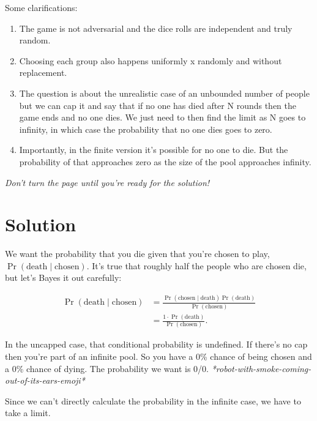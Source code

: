 \documentclass[article,twocolumn]{memoir}
\begin{document}
\newpage

Some clarifications:

\begin{enumerate}
\item The game is not adversarial and the dice rolls are independent and truly random.
\item Choosing each group also happens uniformly x randomly and without replacement.
\item The question is about the unrealistic case of an unbounded number of people but we can cap it and say that if no one has died after N rounds then the game ends and no one dies. 
We just need to then find the limit as N goes to infinity, in which case the probability that no one dies goes to zero.
\item Importantly, in the finite version it's possible for no one to die. 
But the probability of that approaches zero as the size of the pool approaches infinity.
\end{enumerate}

\emph{Don't turn the page until you're ready for the solution!}

\newpage

\chapter*{Solution}

We want the probability that you die given that you're chosen to play, 
$\Pr(\text{death} \mid \text{chosen})$.
It's true that roughly half the people who are chosen die, but let's Bayes it out carefully:

\begin{equation*}
\begin{split}
\Pr(\text{death} \mid \text{chosen}) & =
\frac{\Pr(\text{chosen} \mid \text{death}) \Pr(\text{death})}{\Pr(\text{chosen})} \\
& = \frac{1\cdot\Pr(\text{death})}{\Pr(\text{chosen})}.
\end{split}
\end{equation*}

In the uncapped case, that conditional probability is undefined. 
If there's no cap then you're part of an infinite pool. 
So you have a 0\% chance of being chosen and a 0\% chance of dying. 
The probability we want is 0/0. 
\emph{*robot-with-smoke-coming-out-of-its-ears-emoji*}

Since we can't directly calculate the probability in the infinite case, we have to take a limit.
\end{document}

